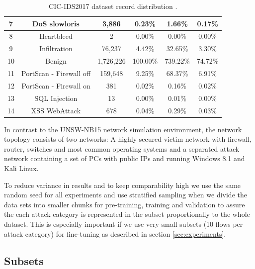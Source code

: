 \begin{table}[H]
\begin{tabular}{cccccc}
		7  & DoS slowloris           & 3,886        & 0.23\%                 & 1.66\%                          & 0.17\%                    \\ \midrule
		8  & Heartbleed              & 2           & 0.00\%                 & 0.00\%                          & 0.00\%                    \\ \midrule
		9  & Infiltration            & 76,237       & 4.42\%                 & 32.65\%                         & 3.30\%                    \\ \midrule
		10 & Benign                  & 1,726,226     & 100.00\%               & 739.22\%                        & 74.72\%                   \\ \midrule
		11 & PortScan - Firewall off & 159,648      & 9.25\%                 & 68.37\%                         & 6.91\%                    \\ \midrule
		12 & PortScan - Firewall on  & 381         & 0.02\%                 & 0.16\%                          & 0.02\%                    \\ \midrule
		13 & SQL Injection           & 13          & 0.00\%                 & 0.01\%                          & 0.00\%                    \\ \midrule
		14 & XSS WebAttack           & 678         & 0.04\%                 & 0.29\%                          & 0.03\%                   
	\end{tabular}
	\caption{CIC-IDS2017 dataset record distribution \cite{cic_ids_2017_analysis}.}
	\label{table:methodology:datasets:cic_ids_2017_categories}
\end{table}

In contrast to the UNSW-NB15 network simulation environment, the network topology consists of two networks: A highly secured victim network with firewall, router, switches and most common operating systems and a separated attack network containing a set of PCs with public IPs and running Windows 8.1 and Kali Linux.

To reduce variance in results and to keep comparability high we use the same random seed for all experiments and use stratified sampling when we divide the data sets into smaller chunks for pre-training, training and validation to assure the each attack category is represented in the subset proportionally to the whole dataset. This is especially important if we use very small subsets (10 flows per attack category) for fine-tuning as described in section \ref{sec:experiments}. 

\subsection{Subsets} \label{sec:methodology:subsets}

